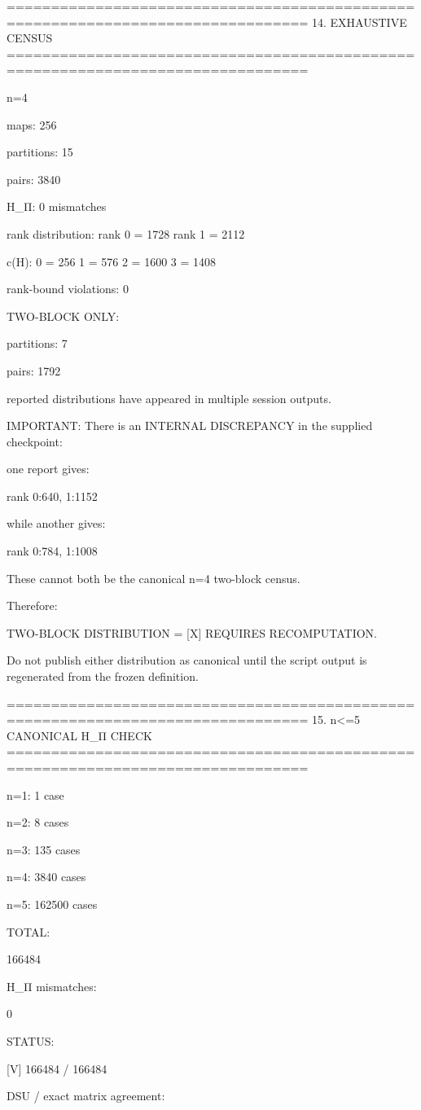 ================================================================================
14. EXHAUSTIVE CENSUS
================================================================================

n=4

maps:
256

partitions:
15

pairs:
3840

H_Π:
0 mismatches

rank distribution:
rank 0 = 1728
rank 1 = 2112

c(H):
0 = 256
1 = 576
2 = 1600
3 = 1408

rank-bound violations:
0

TWO-BLOCK ONLY:

partitions:
7

pairs:
1792

reported distributions have appeared in multiple session outputs.

IMPORTANT:
There is an INTERNAL DISCREPANCY in the supplied checkpoint:

one report gives:

rank {0:640, 1:1152}

while another gives:

rank {0:784, 1:1008}

These cannot both be the canonical n=4 two-block census.

Therefore:

TWO-BLOCK DISTRIBUTION = [X] REQUIRES RECOMPUTATION.

Do not publish either distribution as canonical until the script output
is regenerated from the frozen definition.

================================================================================
15. n<=5 CANONICAL H_Π CHECK
================================================================================

n=1:
1 case

n=2:
8 cases

n=3:
135 cases

n=4:
3840 cases

n=5:
162500 cases

TOTAL:

166484

H_Π mismatches:

0

STATUS:

[V] 166484 / 166484

DSU / exact matrix agreement:

